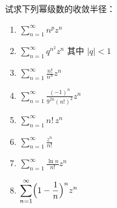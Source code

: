 \begin{question}
试求下列幂级数的收敛半径：
\begin{enumerate}
  \item \(\displaystyle\sum_{n=1}^{\infty} n^p z^n\)
  \item \(\displaystyle\sum_{n=1}^{\infty} q^{n^2} z^n\) 其中 \(|q| < 1\)
  \item \(\displaystyle\sum_{n=1}^{\infty} \frac{n!}{n^n} z^n\)
  \item \(\displaystyle\sum_{n=1}^{\infty} \frac{(-1)^n}{9^{2n}(n!)^2} z^n\)
  \item \(\displaystyle\sum_{n=1}^{\infty} n! \, z^n\)
  \item \(\displaystyle\sum_{n=1}^{\infty} \frac{z^n}{n!}\)
  \item \(\displaystyle\sum_{n=1}^{\infty} \frac{\ln n}{n!} z^n\)
  \item \(\displaystyle\sum_{n=1}^{\infty} \Bigl(1-\frac1n\Bigr)^{n} z^n\)
\end{enumerate}


\end{question}
